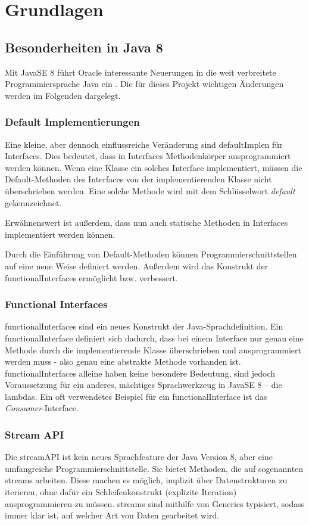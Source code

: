 \chapter{Grundlagen}
\section{Besonderheiten in Java 8} \label{sec:grundJava8}
Mit JavaSE 8 führt Oracle interessante Neuerungen in die weit verbreitete Programmiersprache Java ein \cite[S. 35]{Ullenboom2014}. Die für dieses Projekt wichtigen Änderungen werden im Folgenden dargelegt.
\subsection{Default Implementierungen} \label{sec:javaDefault}
Eine kleine, aber dennoch einflussreiche Veränderung sind \gls{defaultImpl}en für Interfaces. Dies bedeutet, dass in Interfaces Methodenkörper ausprogrammiert werden können. Wenn eine Klasse ein solches Interface implementiert, müssen die Default-Methoden des Interfaces von der implementierenden Klasse nicht überschrieben werden. Eine solche Methode wird mit dem Schlüsselwort \textit{default} gekennzeichnet. \cite[S. 45f.]{Ullenboom2014}

Erwähnenswert ist außerdem, dass nun auch statische Methoden in Interfaces implementiert werden können. \cite[S. 48f.]{Ullenboom2014}

Durch die Einführung von Default-Methoden können Programmierschnittstellen auf eine neue Weise definiert werden. Außerdem wird das Konstrukt der \gls{functionalInterface}s ermöglicht bzw. verbessert.
\subsection{Functional Interfaces} \label{sec:javaFunctional}
\gls{functionalInterface}s sind ein neues Konstrukt der Java-Sprachdefinition. Ein \gls{functionalInterface} definiert sich dadurch, dass bei einem Interface nur genau eine Methode durch die implementierende Klasse überschrieben und ausprogrammiert werden muss - also genau eine abstrakte Methode vorhanden ist. \gls{functionalInterface}s alleine haben keine besondere Bedeutung, sind jedoch Voraussetzung für ein anderes, mächtiges Sprachwerkzeug in JavaSE 8 – die \glspl{lambda}. Ein oft verwendetes Beispiel für ein \gls{functionalInterface} ist das \textit{Consumer}-Interface. \cite[S. 63f.]{Ullenboom2014}
\subsection{Stream API} \label{sec:javaStream}
Die \gls{streamAPI} ist kein neues Sprachfeature der Java Version 8, aber eine umfangreiche Programmierschnittstelle. Sie bietet Methoden, die auf sogenannten \gls{stream}s arbeiten. Diese machen es möglich, implizit über Datenstrukturen zu iterieren, ohne dafür ein Schleifenkonstrukt (explizite Iteration) ausprogrammieren zu müssen. \gls{stream}s sind mithilfe von Generics typisiert, sodass immer klar ist, auf welcher Art von Daten gearbeitet wird. \cite[S. 391f.]{Ullenboom2014}

